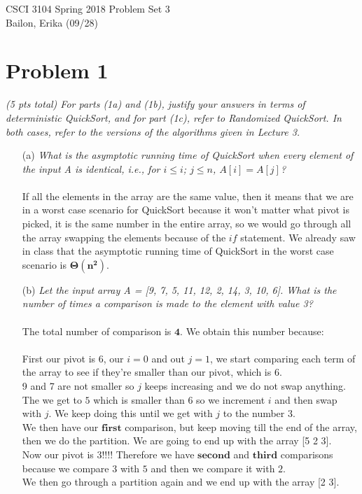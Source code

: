 \documentclass[12pt]{article} \setlength{\oddsidemargin}{0in}
\begin{document}
\noindent CSCI 3104 Spring 2018 \hfill Problem Set 3\\
Bailon, Erika (09/28)

\hrulefill

{\selectfont

  \section*{Problem 1}

  \textit{(5 pts total) For parts (1a) and (1b), justify your answers
    in terms of deterministic QuickSort, and for part (1c), refer to
    Randomized QuickSort. In both cases, refer to the versions of the
    algorithms given in Lecture 3.}

  \begin{enumerate} %
  \item[(a)]{\textit{What is the asymptotic running time of QuickSort when
      every element of the input A is identical, i.e., for $i \le i$;
      $j \le n$, $A[i] = A[j]$?}}
    \\\\
    If all the elements in the array are the same value, then it means that we are in a worst case scenario for QuickSort because it won't matter what pivot is picked, it is the same number in the entire array, so we would go through all the array swapping the elements because of the $if$ statement. We already saw in class that the asymptotic running time of QuickSort in the worst case scenario is $\mathbf{\Theta (n^2)}$.  
    \\
  \item[(b)]{\textit{Let the input array A = [9, 7, 5, 11, 12, 2, 14, 3, 10,	%
      6]. What is the number of times a comparison is made to the
      element with value 3?}}
    \\\\
    The total number of comparison is $\mathbf{4}$. We obtain this number because:\\\\
    First our pivot is 6, our $i=0$ and out $j=1$, we start comparing each term of the array to see if they're smaller than our pivot, which is 6. \\
    9 and 7 are not smaller so $j$ keeps increasing and we do not swap anything.\\The we get to $5$ which is smaller than $6$ so we increment $i$ and then swap with $j$. We keep doing this until we get with $j$ to the number $3$. \\We then have our $\mathbf{first}$ comparison, but keep moving till the end of the array, then we do the partition. We are going to end up with the array [5    2    3]. \\ Now our pivot is $3$!!!! Therefore we have $\mathbf{second}$ and $\mathbf{ third}$ comparisons because we compare $3$ with $5$ and then we compare it with $2$. \\We then go through a partition again and we end up with the array [2    3].\\

\end{enumerate}}
\end{document}
